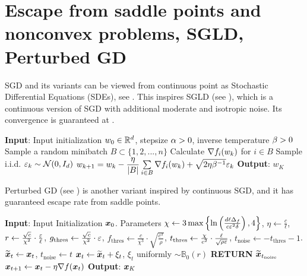 \section{Escape from saddle points and nonconvex problems, SGLD, Perturbed GD}

SGD and its variants can be viewed from continuous point as Stochastic Differential Equations (SDEs), see \cite{HuLiLiLiuDiffusionApproximateSGD}.
This inspires SGLD (see \cite{SGLDpaper}), which is a continuous version of SGD with additional moderate and isotropic noise. Its convergence is guaranteed at \cite{SGLDConvergence}. 

\begin{algorithm}[H]
\caption{Stochastic Gradient Langevin Dynamics: minimizing $P(w)=\dfrac{1}{n}\sum\li_{i=1}^n f_i(w)$}
\label{Alg:SGLD}
\begin{algorithmic}[1]
\STATE \textbf{Input}: Input initialization $w_0\in \mathbb R^d$, stepsize $\alpha>0$, inverse temperature $\beta>0$
    \STATE Sample a random minibatch $B\subset \{1,2,...,n\}$
    \STATE Calculate $\nabla f_i(w_k)$ for $i\in B$
    \STATE Sample i.i.d. $\varepsilon_k\sim \mathcal N(0, I_d)$
    \STATE $w_{k+1}=w_k-\dfrac{\eta}{|B|} \sum\limits_{i\in B}\nabla f_i(w_k)+\sqrt{2\eta \beta^{-1}}\varepsilon_k$
\ENDFOR
\STATE \textbf{Output}: $w_K$
\end{algorithmic}
\end{algorithm}


Perturbed GD (see \cite{PerturbedGDpaper}) is another variant inspired by continuous SGD, and it has guaranteed escape rate from saddle points.


\begin{algorithm}[H]
\caption{Perturbed Gradient Descent: PGD$(\boldx_0, \ell, \rho, \ve, c, \dt, \Dt_f)$}
\label{Alg:PGD}
\begin{algorithmic}[1]
\STATE \textbf{Input}: Input Initialization $\boldsymbol{x}_0$. 
\STATE Parameters $\chi \leftarrow 3\max\left\{\ln\left(\frac{d\ell \Delta_f}{c\varepsilon^2\delta}\right), 4\right\}$,
$\eta \leftarrow \frac{c}{\ell}$, $r \leftarrow \frac{\sqrt{c}}{\chi^2}\cdot \frac{\varepsilon}{\ell}$, 
$g_{\text{thres}}\leftarrow \frac{\sqrt{c}}{\chi^2}\cdot \varepsilon$, 
$f_{\text{thres}}\leftarrow \frac{c}{\chi^3}\cdot \sqrt{\frac{c^3}{\rho}}$,
$t_{\text{thres}}\leftarrow \frac{\chi}{c^2}\cdot \frac{\ell}{\sqrt{\rho\varepsilon}}$,
$t_{\text{noise}}\leftarrow -t_{\text{thres}}-1$. 
        \STATE $\widetilde{\boldsymbol{x}}_t\leftarrow \boldsymbol{x}_t$, $t_{\text{noise}}\leftarrow t$
        \STATE $\boldsymbol{x}_t\leftarrow \widetilde{\boldsymbol{x}}_t+\xi_t$, $\xi_t$ uniformly $\sim \mathbb{B}_0(r)$
    \ENDIF
        \STATE \textbf{RETURN} $\widetilde{\boldsymbol{x}}_{t_{\text{noise}}}$
    \ENDIF
    \STATE $\boldsymbol{x}_{t+1}\leftarrow \boldsymbol{x}_t-\eta \nabla f(\boldsymbol{x}_t)$
\ENDFOR
\STATE \textbf{Output}: $\boldsymbol{x}_K$
\end{algorithmic}
\end{algorithm}

